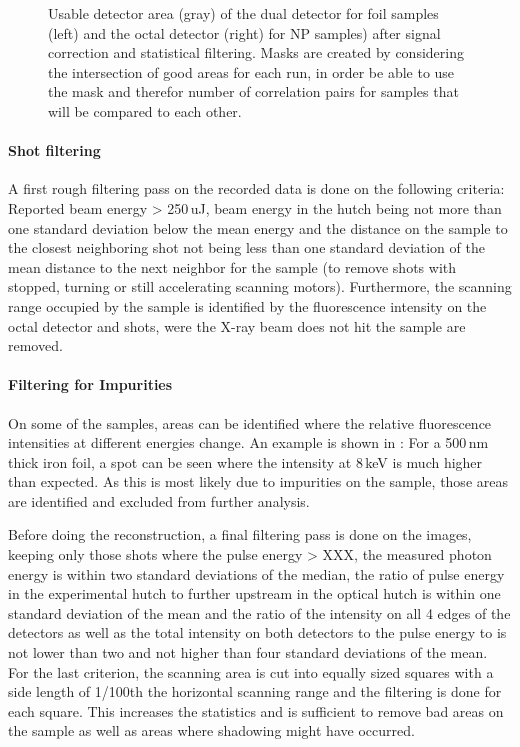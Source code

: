 \begin{figure}
\begin{subfigure}{0.2\textwidth}
	\end{subfigure}
	\caption[Usable detector area]{Usable detector area (gray) of the dual detector for foil samples (left) and the octal detector (right) for NP samples) after signal correction and statistical filtering. Masks are created by considering the intersection of good areas for each run, in order be able to use the mask and therefor number of correlation pairs for samples that will be compared to each other.}	
\end{figure}

\paragraph{Shot filtering}
A first rough filtering pass on the recorded data is done on the following criteria: Reported beam energy > 250\,uJ, beam energy in the hutch being not more than one standard deviation below the mean energy and the distance on the sample to the closest neighboring shot not being less than one standard deviation of the mean distance to the next neighbor for the sample (to remove shots with stopped, turning or still accelerating scanning motors). Furthermore, the scanning range occupied by the sample is identified by the fluorescence intensity on the octal detector and shots, were the X-ray beam does not hit the sample are removed.

 
\paragraph{Filtering for Impurities}
On some of the samples, areas can be identified where the relative fluorescence intensities at different energies change. An example is shown in : For a 500\,nm thick iron foil, a spot can be seen where the intensity at 8\,keV is much higher than expected. As this is most likely due to impurities on the sample, those areas are identified and excluded from further analysis.

Before doing the reconstruction, a final filtering pass is done on the images, keeping only those shots where the pulse energy > XXX, the measured photon energy is within two standard deviations of the median,
the ratio of pulse energy in the experimental hutch to further upstream in the optical hutch is within one standard deviation of the mean and the ratio of the intensity on all 4 edges of the detectors as well as  the total intensity on both detectors  to the pulse energy to is not lower than two and not higher than four standard deviations of the mean.
For the last criterion, the scanning area is cut into equally sized squares with a side length of 1/100th the horizontal scanning range and the filtering is done for each square. This increases the statistics and is sufficient to remove bad areas on the sample as well as areas where shadowing might have occurred.

